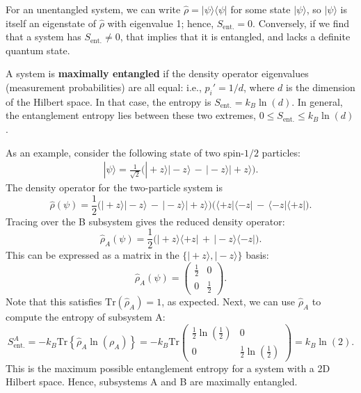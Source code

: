 \documentclass[pra,12pt]{revtex4}
\begin{document}
For an unentangled system, we can write $\hat{\rho} =
|\psi\rangle\langle\psi|$ for some state $|\psi\rangle$, so
$|\psi\rangle$ is itself an eigenstate of $\hat{\rho}$ with eigenvalue
1; hence, $S_{\mathrm{ent.}} = 0$.  Conversely, if we find that a
system has $S_{\mathrm{ent.}} \ne 0$, that implies that it is
entangled, and lacks a definite quantum state.

A system is \textbf{maximally entangled} if the density operator
eigenvalues (measurement probabilities) are all equal: i.e., $p_i' =
1/d$, where $d$ is the dimension of the Hilbert space.  In that case,
the entropy is $S_{\mathrm{ent.}} = k_B \ln(d)$.  In general, the
entanglement entropy lies between these two extremes, $0 \le
S_{\mathrm{ent.}} \le k_B\ln(d)$.

As an example, consider the following state of two spin-$1/2$ particles:
\begin{align}
  |\psi\rangle = \frac{1}{\sqrt{2}} \Big(|\!+\!z\rangle|\!-\!z\rangle \,-\, |\!-\!z\rangle|\!+\!z\rangle\Big).
\end{align}
The density operator for the two-particle system is
\begin{equation}
  \hat{\rho}(\psi) = \frac{1}{2} \Big(|\!+\!z\rangle|\!-\!z\rangle \,-\, |\!-\!z\rangle|\!+\!z\rangle\Big) \Big(\langle+z|\langle-z| \,-\, \langle-z|\langle+z|\Big).
\end{equation}
Tracing over the B subsystem gives the reduced density operator:
\begin{equation}
  \hat{\rho}_A(\psi) = \frac{1}{2} \Big(|\!+\!z\rangle \langle+z| \,+\, |\!-\!z\rangle \langle-z|\Big).
\end{equation}
This can be expressed as a matrix in the
$\{|\!+z\rangle,|\!-z\rangle\}$ basis:
\begin{equation}
  \hat{\rho}_A(\psi) = \begin{pmatrix}\frac{1}{2} & 0 \\ 0 & \frac{1}{2}\end{pmatrix}.
\end{equation}
Note that this satisfies $\mathrm{Tr}(\hat\rho_A) = 1$, as expected.
Next, we can use $\hat{\rho}_A$ to compute the entropy of subsystem A:
\begin{equation}
  S_{\mathrm{ent.}}^A = -k_B\mathrm{Tr}\left\{\hat{\rho}_A\ln(\rho_A)\right\} = -k_B\mathrm{Tr}\begin{pmatrix}\frac{1}{2}\ln\left(\frac{1}{2}\right) & 0 \\ 0 & \frac{1}{2}\ln\left(\frac{1}{2}\right)\end{pmatrix} = k_B\ln(2).
\end{equation}
This is the maximum possible entanglement entropy for a system with a
2D Hilbert space.  Hence, subsystems A and B are maximally entangled.
\end{document}
